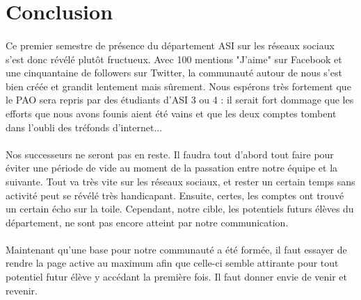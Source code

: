 \section{Conclusion}

\paragraph{}
Ce premier semestre de présence du département ASI sur les réseaux sociaux s'est donc révélé plutôt fructueux. Avec 100 mentions "J'aime" sur Facebook et une cinquantaine de followers sur Twitter, la communauté autour de nous s'est bien créée et grandit lentement mais sûrement. Nous espérons très fortement que le PAO sera repris par des étudiants d'ASI 3 ou 4 : il serait fort dommage que les efforts que nous avons founis aient été vains et que les deux comptes tombent dans l'oubli des tréfonds d'internet...

\paragraph{}
Nos successeurs ne seront pas en reste. Il faudra tout d'abord tout faire pour éviter une période de vide au moment de la passation entre notre équipe et la suivante. Tout va très vite sur les réseaux sociaux, et rester un certain temps sans activité peut se révélé très handicapant. Ensuite, certes, les comptes ont trouvé un certain écho sur la toile. Cependant, notre cible, les potentiels futurs élèves du département, ne sont pas encore atteint par notre communication.

\paragraph{}
Maintenant qu'une base pour notre communauté a été formée, il faut essayer de rendre la page active au maximum afin que celle-ci semble attirante pour tout potentiel futur élève y accédant la première fois. Il faut donner envie de venir et revenir.